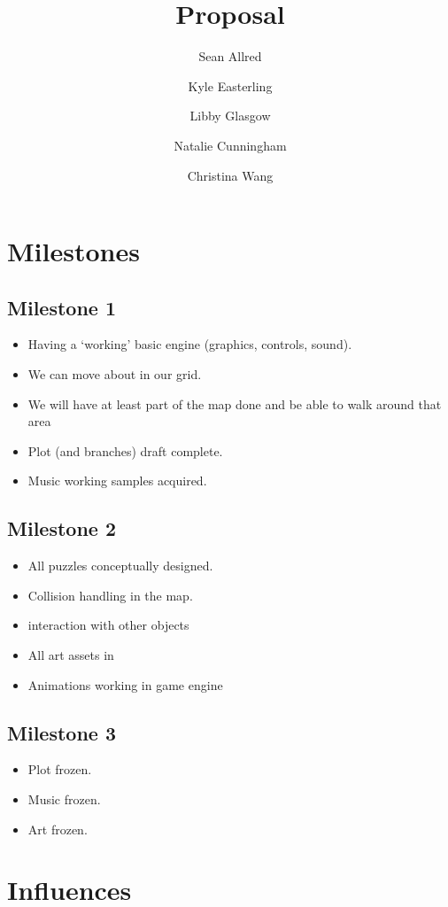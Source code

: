 \documentclass{article}
\title{Proposal}
\author{%
  Sean Allred \and
  Kyle Easterling \and
  Libby Glasgow \and
  Natalie Cunningham \and
  Christina Wang}
\begin{document}
\maketitle
\noindent

\section{Milestones}
\label{sec:milestones}

\subsection{Milestone 1}
\label{sec:milestone-1}
\begin{itemize}
\item Having a `working' basic engine
  (graphics, controls, sound).
\item We can move about in our grid.
\item We will have at least part of the map done
  and be able to walk around that area
\item Plot (and branches) draft complete.
\item Music working samples acquired.
\end{itemize}

\subsection{Milestone 2}
\label{sec:milestone-2}
\begin{itemize}
\item All puzzles conceptually designed.
\item Collision handling in the map.
\item interaction with other objects
\item All art assets in
\item Animations working in game engine
\end{itemize}

\subsection{Milestone 3}
\label{sec:milestone-3}
\begin{itemize}
\item Plot frozen.
\item Music frozen.
\item Art frozen.
\end{itemize}

\section{Influences}
\label{sec:influences}
\end{document}
